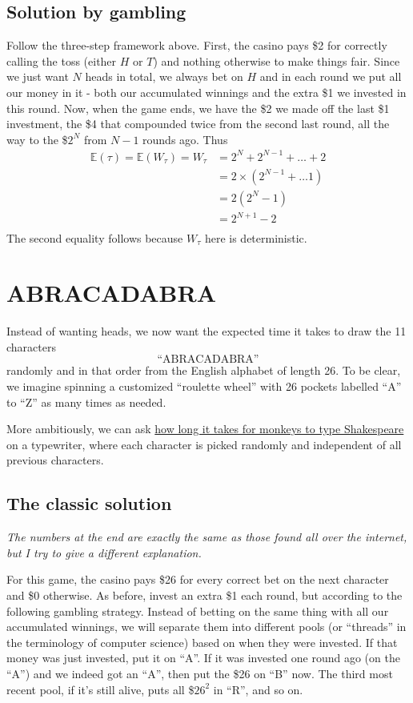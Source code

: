 \documentclass[11pt]{article}
\newcommand{\E}{\mathbb{E}}
\begin{document}
\subsection{Solution by gambling}
Follow the three-step framework above. First, the casino pays \$2 for correctly calling the toss (either $H$ or $T$) and nothing otherwise to make things fair. Since we just want $N$ heads in total, we always bet on $H$ and in each round we put all our money in it - both our accumulated winnings and the extra \$1 we invested in this round. Now, when the game ends, we have the \$2 we made off the last \$1 investment, the \$4 that compounded twice from the second last round, all the way to the \$$2^N$ from $N-1$ rounds ago. Thus
\begin{align*}
\E(\tau) = \E(W_\tau) = W_\tau &= 2^N + 2^{N-1} + \dots + 2 \\
&= 2\times(2^{N-1} + \dots 1) \\
&= 2(2^N - 1) \\
&= \boxed{2^{N+1} - 2} \\
\end{align*}
The second equality follows because $W_\tau$ here is deterministic.

\section{ABRACADABRA}
Instead of wanting heads, we now want the expected time it takes to draw the 11 characters $$\text{``ABRACADABRA''}$$ randomly and in that order from the English alphabet of length 26. To be clear, we imagine spinning a customized ``roulette wheel'' with 26 pockets labelled ``A'' to ``Z'' as many times as needed.

More ambitiously, we can ask \href{https://en.wikipedia.org/wiki/Infinite_monkey_theorem}{how long it takes for monkeys to type Shakespeare} on a typewriter, where each character is picked randomly and independent of all previous characters.

\subsection{The classic solution}
\textit{The numbers at the end are exactly the same as those found all over the internet, but I try to give a different explanation.}

For this game, the casino pays \$26 for every correct bet on the next character and \$0 otherwise. As before, invest an extra \$1 each round, but according to the following gambling strategy.
Instead of betting on the same thing with all our accumulated winnings, we will separate them into different pools (or ``threads'' in the terminology of computer science) based on when they were invested. If that money was just invested, put it on ``A''. If it was invested one round ago (on the ``A'') and we indeed got an ``A'', then put the \$26 on ``B'' now. The third most recent pool, if it's still alive, puts all \$$26^2$ in ``R'', and so on.
\end{document}
